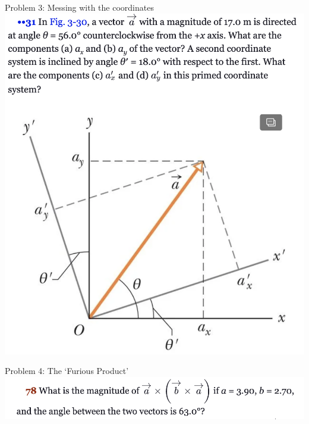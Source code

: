   \begin{frame}{Problem 3: Messing with the coordinates}
\small
\includegraphics[scale=0.34]{coords}
\end{frame}

  \begin{frame}{Problem 4: The `Furious Product'}
\small
\includegraphics[scale=0.5]{furious}\\[18ex]

\end{frame}
%
%



 
